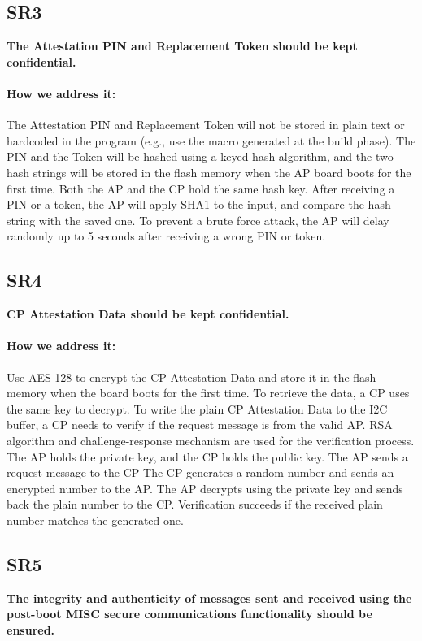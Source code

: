 \documentclass[11pt,oneside,onecolumn,letterpaper]{article}
\newcounter{alg}
\begin{document}
	\subsection{SR3}
	\textbf{The Attestation PIN and Replacement Token should be kept confidential.}
	\paragraph{How we address it:}
	The Attestation PIN and Replacement Token will not be stored in plain text or hardcoded in the program (e.g., use the macro generated at the build phase).
	The PIN and the Token will be hashed using a keyed-hash algorithm,
	and the two hash strings will be stored in the flash memory when the AP board boots for the first time.
	Both the AP and the CP hold the same hash key.
	After receiving a PIN or a token,
	the AP will apply SHA1 to the input,
	and compare the hash string with the saved one.
	To prevent a brute force attack,
	the AP will delay randomly up to 5 seconds after receiving a wrong PIN or token.
	
	\subsection{SR4}
	\textbf{CP Attestation Data should be kept confidential.}
	\paragraph{How we address it:}
	Use AES-128 to encrypt the CP Attestation Data and store it in the flash memory when the board boots for the first time.
	To retrieve the data,
	a CP uses the same key to decrypt.
	To write the plain CP Attestation Data to the I2C buffer,
	a CP needs to verify if the request message is from the valid AP.
	RSA algorithm and challenge-response mechanism are used for the verification process.
	The AP holds the private key,
	and the CP holds the public key.
	The AP sends a request message to the CP
	The CP generates a random number and sends an encrypted number to the AP.
	The AP decrypts using the private key and sends back the plain number to the CP.
	Verification succeeds if the received plain number matches the generated one.
	
	\subsection{SR5}
	\textbf{The integrity and authenticity of messages sent and received using the post-boot MISC secure communications functionality should be ensured.}
\end{document}
